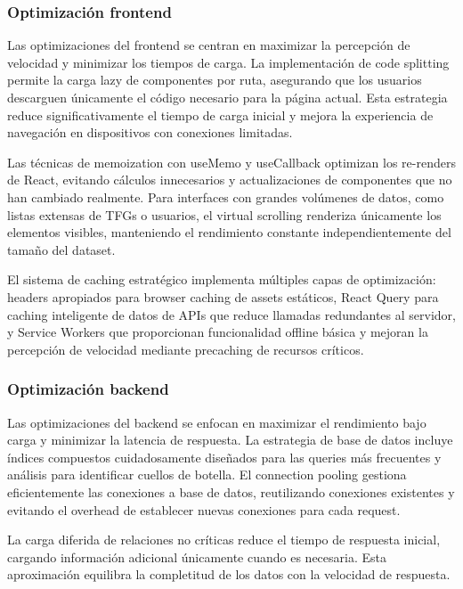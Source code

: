 \documentclass[12pt,a4paper,oneside]{report}
\begin{document}
\subsubsection{Optimización frontend}\label{optimizaciuxf3n-frontend}

Las optimizaciones del frontend se centran en maximizar la percepción de velocidad y minimizar los tiempos de carga. La implementación de code splitting permite la carga lazy de componentes por ruta, asegurando que los usuarios descarguen únicamente el código necesario para la página actual. Esta estrategia reduce significativamente el tiempo de carga inicial y mejora la experiencia de navegación en dispositivos con conexiones limitadas.

Las técnicas de memoization con useMemo y useCallback optimizan los re-renders de React, evitando cálculos innecesarios y actualizaciones de componentes que no han cambiado realmente. Para interfaces con grandes volúmenes de datos, como listas extensas de TFGs o usuarios, el virtual scrolling renderiza únicamente los elementos visibles, manteniendo el rendimiento constante independientemente del tamaño del dataset.

El sistema de caching estratégico implementa múltiples capas de optimización: headers apropiados para browser caching de assets estáticos, React Query para caching inteligente de datos de APIs que reduce llamadas redundantes al servidor, y Service Workers que proporcionan funcionalidad offline básica y mejoran la percepción de velocidad mediante precaching de recursos críticos.

\subsubsection{Optimización backend}\label{optimizaciuxf3n-backend}

Las optimizaciones del backend se enfocan en maximizar el rendimiento bajo carga y minimizar la latencia de respuesta. La estrategia de base de datos incluye índices compuestos cuidadosamente diseñados para las queries más frecuentes y análisis para identificar cuellos de botella. El connection pooling gestiona eficientemente las conexiones a base de datos, reutilizando conexiones existentes y evitando el overhead de establecer nuevas conexiones para cada request.

La carga diferida de relaciones no críticas reduce el tiempo de respuesta inicial, cargando información adicional únicamente cuando es necesaria. Esta aproximación equilibra la completitud de los datos con la velocidad de respuesta.
\end{document}
